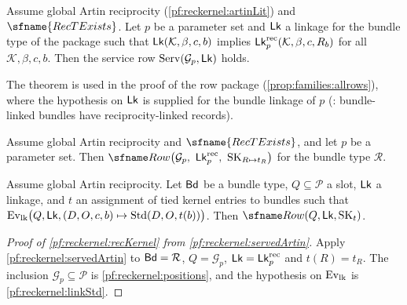 \begin{theorem}\label{pf:reckernel:main}
Assume global Artin reciprocity (\cref{pf:reckernel:artinLit}) and $\sfname{RecTExists}$. Let $p$ be a parameter set
and $\mathsf{Lk}$ a linkage for the bundle type of the package such that $\mathsf{Lk}(\mathcal K,\beta,c,b)$ implies
$\mathsf{Lk}^{\mathrm{rec}}_p(\mathcal K,\beta,c,R_b)$ for all $\mathcal K,\beta,c,b$. Then the service row $\mathrm{Serv}(\mathcal G_p,\mathsf{Lk})$
holds.
\end{theorem}

The theorem is used in the proof of the row package (\cref{prop:families:allrows}), where the hypothesis on $\mathsf{Lk}$
is supplied for the bundle linkage of $p$
(: bundle-linked bundles have reciprocity-linked
records).

\begin{theorem}\label{pf:reckernel:recKernel}
Assume global Artin reciprocity and $\sfname{RecTExists}$, and let $p$ be a parameter set. Then
$\reckRow\bigl(\mathcal G_p,\ \reckLk^{\mathrm{rec}}_p,\ \reckServH_{R\mapsto t_R}\bigr)$ for the bundle type $\mathcal R$.
\end{theorem}

\begin{theorem}\label{pf:reckernel:servedArtin}
Assume global Artin reciprocity. Let $\mathsf{Bd}$ be a bundle type, $Q\subseteq\mathcal P$ a slot, $\mathsf{Lk}$ a linkage,
and $t$ an assignment of tied kernel entries to bundles such that
$\mathrm{Ev}_{\mathrm{lk}}\bigl(Q,\mathsf{Lk},(D,O,c,b)\mapsto\mathrm{Std}(D,O,t(b))\bigr)$. Then $\reckRow(Q,\reckLk,\reckServH_t)$.
\end{theorem}

\begin{proof}[Proof of \cref{pf:reckernel:recKernel} from \cref{pf:reckernel:servedArtin}]
Apply \cref{pf:reckernel:servedArtin} to $\mathsf{Bd}=\mathcal R$, $Q=\mathcal G_p$, $\mathsf{Lk}=\mathsf{Lk}^{\mathrm{rec}}_p$ and
$t(R)=t_R$. The inclusion $\mathcal G_p\subseteq\mathcal P$ is \cref{pf:reckernel:positions}, and the hypothesis on
$\mathrm{Ev}_{\mathrm{lk}}$ is \cref{pf:reckernel:linkStd}.
\end{proof}

